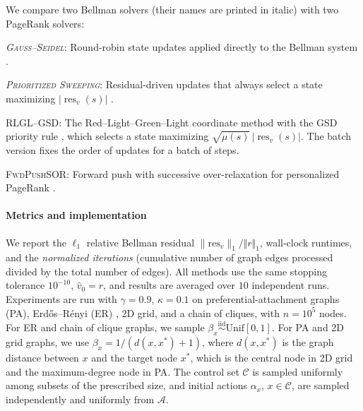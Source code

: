 \documentclass[letterpaper, 10 pt, conference]{ieeeconf}
\begin{document}
We compare two Bellman solvers (their names are printed in italic) with two PageRank solvers:
\medskip

\noindent\textit{\textsc{Gauss--Seidel}}:
Round-robin state updates applied directly to the Bellman system
\cite[Chapter~6]{puterman2014markov}.

\smallskip
\noindent\textit{\textsc{Prioritized Sweeping}}:
Residual-driven updates that always select a state maximizing
$|\operatorname{res}_v(s)|$
\cite{moore1993prioritized,andre1997generalized}.

\smallskip
\noindent\textsc{RLGL--GSD}:
The Red--Light--Green--Light coordinate method \cite{RLGL} with
the \textsc{GSD} priority rule \cite{RLGL_VAR}, which selects a state
maximizing $\sqrt{\mu(s)}\,|\operatorname{res}_v(s)|$. The batch version fixes the order of updates for a batch of steps. 

\smallskip
\noindent\textsc{FwdPushSOR}:
Forward push with successive over-relaxation for personalized PageRank
\cite{chen2023accelerating}.
\medskip

\paragraph{Metrics and implementation}
We report the $\ell_1$ relative Bellman residual $\|\text{res}_v\|_1 / \Vert r\Vert_1$, wall-clock runtimes, and the \emph{normalized iterations} (cumulative number of graph edges processed divided by the total number of edges). All methods use the same stopping tolerance $10^{-10}$, $\hat v_0 = r$, and results are averaged over $10$ independent runs. Experiments are run with $\gamma = 0.9$, $\kappa=0.1$ on preferential-attachment graphs (PA), Erdős–Rényi (ER) \cite{REMCO}, 2D grid, and a chain of cliques, with $n=10^5$ nodes. For ER and chain of clique graphs, we sample $\beta_x\overset{\mathrm{iid}}{\sim}\mathrm{Unif}[0,1]$. For PA and 2D grid graphs, we use $\beta_x=1/(d(x,x^*)+1)$, where $d(x,x^*)$ is the graph distance between $x$ and the target node $x^*$, which is the central node in 2D grid and the maximum-degree node in PA. The control set $\mathcal C$ is sampled uniformly among subsets of the prescribed size, and initial actions $\alpha_x$, $x\in\mathcal C$, are sampled independently and uniformly from $\mathscr{A}$.
\end{document}
